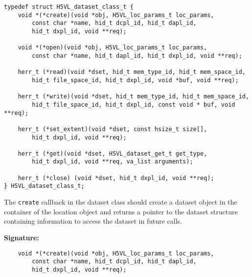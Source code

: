 \begin{lstlisting}
typedef struct H5VL_dataset_class_t {
    void *(*create)(void *obj, H5VL_loc_params_t loc_params, 
        const char *name, hid_t dcpl_id, hid_t dapl_id, 
        hid_t dxpl_id, void **req);

    void *(*open)(void *obj, H5VL_loc_params_t loc_params, 
        const char *name, hid_t dapl_id, hid_t dxpl_id, void **req);

    herr_t (*read)(void *dset, hid_t mem_type_id, hid_t mem_space_id, 
        hid_t file_space_id, hid_t dxpl_id, void *buf, void **req);

    herr_t (*write)(void *dset, hid_t mem_type_id, hid_t mem_space_id, 
        hid_t file_space_id, hid_t dxpl_id, const void * buf, void **req);

    herr_t (*set_extent)(void *dset, const hsize_t size[], 
        hid_t dxpl_id, void **req);

    herr_t (*get)(void *dset, H5VL_dataset_get_t get_type, 
        hid_t dxpl_id, void **req, va_list arguments);

    herr_t (*close) (void *dset, hid_t dxpl_id, void **req);
} H5VL_dataset_class_t;
\end{lstlisting}

The {\tt create} callback in the dataset class should create a dataset
object in the container of the location object and returns a pointer
to the dataset structure containing information to access the dataset
in future calls.

\textbf{Signature:}
\begin{lstlisting}
    void *(*create)(void *obj, H5VL_loc_params_t loc_params, 
        const char *name, hid_t dcpl_id, hid_t dapl_id, 
        hid_t dxpl_id, void **req);
\end{lstlisting}

